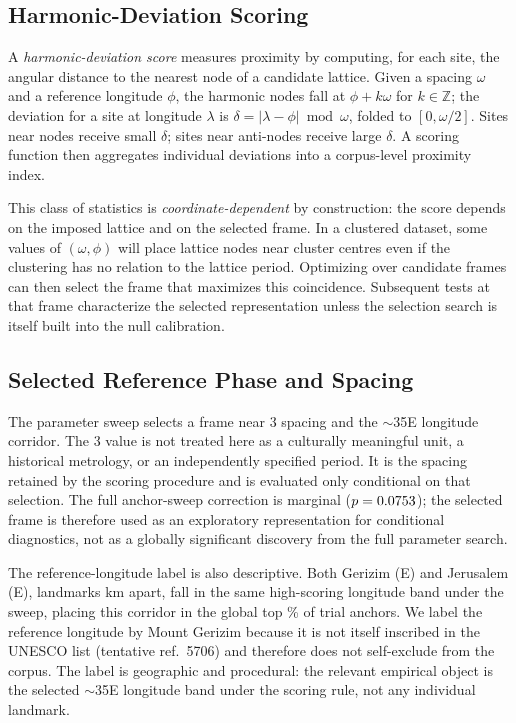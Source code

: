 \documentclass[12pt,a4paper]{article}
\begin{document}
\subsection{Harmonic-Deviation Scoring}

A \emph{harmonic-deviation score} measures proximity by computing, for each
site, the angular distance to the nearest node of a candidate lattice. Given
a spacing $\omega$ and a reference longitude $\phi$, the harmonic nodes fall
at $\phi + k\omega$ for $k \in \mathbb{Z}$; the deviation for a site at
longitude $\lambda$ is $\delta = |\lambda - \phi| \bmod \omega$, folded
to $[0, \omega/2]$. Sites near nodes receive small $\delta$; sites near
anti-nodes receive large $\delta$. A scoring function then aggregates
individual deviations into a corpus-level proximity index.

This class of statistics is \emph{coordinate-dependent} by construction: the
score depends on the imposed lattice and on the selected frame. In a clustered
dataset, some values of $(\omega,\phi)$ will place lattice nodes near cluster
centres even if the clustering has no relation to the lattice period.
Optimizing over candidate frames can then select the frame that maximizes
this coincidence. Subsequent tests at that frame characterize the selected
representation unless the selection search is itself built into the null
calibration.

\subsection{Selected Reference Phase and Spacing}

The parameter sweep selects a frame near 3\textdegree{} spacing and the
$\sim$35\textdegree{}E longitude corridor. The 3\textdegree{} value is not
treated here as a culturally meaningful unit, a historical metrology, or an
independently specified period. It is the spacing retained by the scoring
procedure and is evaluated only conditional on that selection. The full
anchor-sweep correction is marginal ($p = 0.0753$); the selected
frame is therefore used as an exploratory representation for conditional
diagnostics, not as a globally significant discovery from the full parameter
search.

The reference-longitude label is also descriptive. Both Gerizim
(\GerizimLon\textdegree{}E) and Jerusalem (\JerusalemLon\textdegree{}E),
landmarks \GerizimJerusalemKm{} km apart, fall in the same high-scoring
longitude band under the sweep, placing this corridor in the global top
\anchorSweepTopPct\% of \anchorSweepNanchors{} trial anchors. We label the
reference longitude by Mount Gerizim because it is not itself inscribed in the
UNESCO list (tentative ref.~5706) and therefore does not self-exclude from the
corpus. The label is geographic and procedural: the relevant empirical object
is the selected $\sim$35\textdegree{}E longitude band under the scoring rule,
not any individual landmark.
\end{document}
